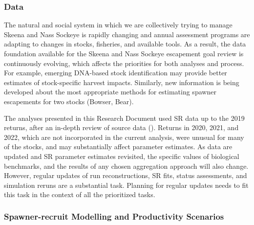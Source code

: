 \documentclass[french,11pt]{book}
\begin{document}
\subsubsection{Data}\label{data}

The natural and social system in which we are collectively trying to manage Skeena and Nass Sockeye is rapidly changing and annual assessment programs are adapting to changes in stocks, fisheries, and available tools. As a result, the data foundation available for the Skeena and Nass Sockeye escapement goal review is continuously evolving, which affects the priorities for both analyses and process. For example, emerging DNA-based stock identification may provide better estimates of stock-specific harvest impacts. Similarly, new information is being developed about the most appropriate methods for estimating spawner escapements for two stocks (Bowser, Bear).

The analyses presented in this Research Document used SR data up to the 2019 returns, after an in-depth review of source data (). Returns in 2020, 2021, and 2022, which are not incorporated in the current analysis, were unusual for many of the stocks, and may substantially affect parameter estimates. As data are updated and SR parameter estimates revisited, the specific values of biological benchmarks, and the results of any chosen aggregation approach will also change. However, regular updates of run reconstructions, SR fits, status assessments, and simulation reruns are a substantial task. Planning for regular updates needs to fit this task in the context of all the prioritized tasks.

\subsubsection{Spawner-recruit Modelling and Productivity Scenarios}\label{spawner-recruit-modelling-and-productivity-scenarios}
\end{document}
